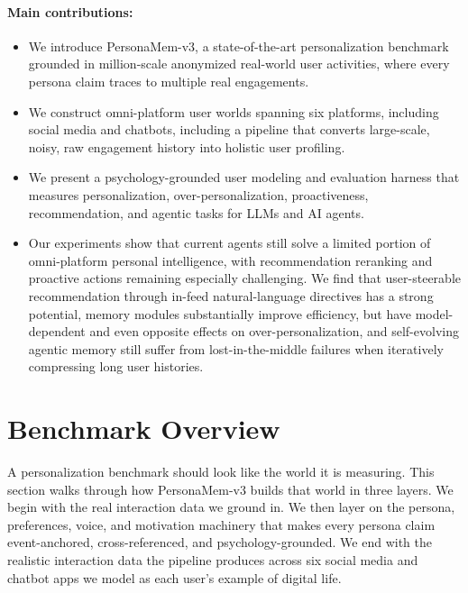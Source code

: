 \documentclass[]{fairmeta}
\begin{document}
\paragraph{Main contributions:}
\begin{itemize}
  \item We introduce PersonaMem-v3, a state-of-the-art personalization benchmark grounded in million-scale anonymized real-world user activities, where every persona claim traces to multiple real engagements.
  \item We construct omni-platform user worlds spanning six platforms, including social media and chatbots, including a pipeline that converts large-scale, noisy, raw engagement history into holistic user profiling.
  \item We present a psychology-grounded user modeling and evaluation harness that measures personalization, over-personalization, proactiveness, recommendation, and agentic tasks for LLMs and AI agents.
  \item Our experiments show that current agents still solve a limited portion of omni-platform personal intelligence, with recommendation reranking and proactive actions remaining especially challenging. We find that user-steerable recommendation through in-feed natural-language directives has a strong potential, memory modules substantially improve efficiency, but have model-dependent and even opposite effects on over-personalization, and self-evolving agentic memory still suffer from lost-in-the-middle failures when iteratively compressing long user histories.
\end{itemize}

\section{Benchmark Overview}
\label{section:benchmark}

A personalization benchmark should look like the world it is measuring. This section walks through how PersonaMem-v3 builds that world in three layers. We begin with the real interaction data we ground in. We then layer on the persona, preferences, voice, and motivation machinery that makes every persona claim event-anchored, cross-referenced, and psychology-grounded. We end with the realistic interaction data the pipeline produces across six social media and chatbot apps we model as each user's example of digital life.
\end{document}
